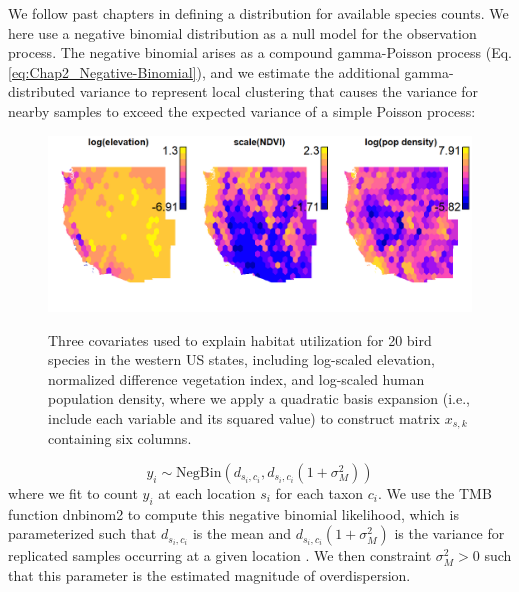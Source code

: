 We follow past chapters in defining a distribution for available species counts. We here use a negative binomial distribution as a null model for the observation process.  The negative binomial arises as a compound gamma-Poisson process (Eq. \ref{eq:Chap2_Negative-Binomial}), and we estimate the additional gamma-distributed variance to represent local clustering that causes the variance for nearby samples to exceed the expected variance of a simple Poisson process: 

\begin{figure}[!ht]
    \caption[Covariates used for 20 western US birds]{Three covariates used to explain habitat utilization for 20 bird species in the western US states, including log-scaled elevation, normalized difference vegetation index, and log-scaled human population density, where we apply a quadratic basis expansion (i.e., include each variable and its squared value) to construct matrix \(x_{s,k}\) containing six columns.}
    \includegraphics[width=5.5in]{Chap_11/Covariates.png}
    \label{fig:Chap11_covariates}
\end{figure}

\begin{equation}
    y_i \sim \mathrm{NegBin}\left( d_{s_i,c_i}, d_{s_i,c_i}(1+\sigma_M^2) \right)
\end{equation}
where we fit to count \(y_i\) at each location \(s_i\) for each taxon \(c_i\).  We use the TMB function \colorbox{backblue}{dnbinom2} to compute this negative binomial likelihood, which is parameterized such that \(d_{s_i,c_i}\) is the mean and \(d_{s_i,c_i}(1+\sigma_M^2)\) is the variance for replicated samples occurring at a given location \cite{linden_using_2011}.  We then constraint \(\sigma_M^2 > 0\) such that this parameter is the estimated magnitude of overdispersion.  

